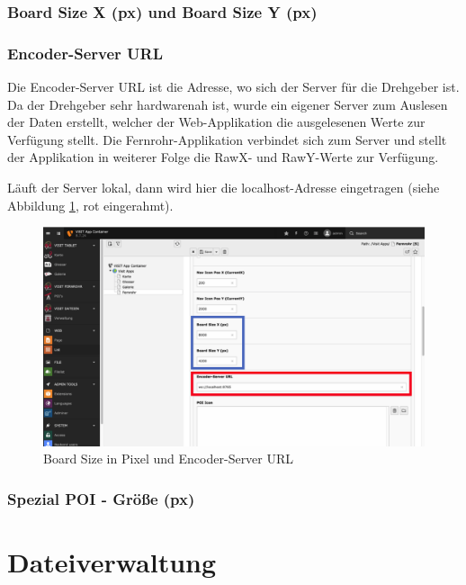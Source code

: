 \subsubsection{Board Size X (px) und Board Size Y (px)}




\subsubsection{Encoder-Server URL}

Die Encoder-Server URL ist die Adresse, wo sich der Server für die Drehgeber ist. Da der Drehgeber sehr hardwarenah ist, wurde ein eigener Server zum Auslesen der Daten erstellt, welcher der Web-Applikation die ausgelesenen Werte zur Verfügung stellt. Die Fernrohr-Applikation verbindet sich zum Server und stellt der Applikation in weiterer Folge die RawX- und RawY-Werte zur Verfügung.

Läuft der Server lokal, dann wird hier die localhost-Adresse eingetragen (siehe Abbildung \ref{img:board_size_encoder_url}, rot eingerahmt).

\begin{figure}[ht!]
\centering
\includegraphics[width=12cm]{Figures/paula/fernrohr/einrichtung_fernrohr/board_size_encoder_url.png}
\caption{Board Size in Pixel und Encoder-Server URL}
\label{img:board_size_encoder_url}
\end{figure}


\subsubsection{Spezial POI - Größe (px)}








\cleardoublepage

\section{Dateiverwaltung}


